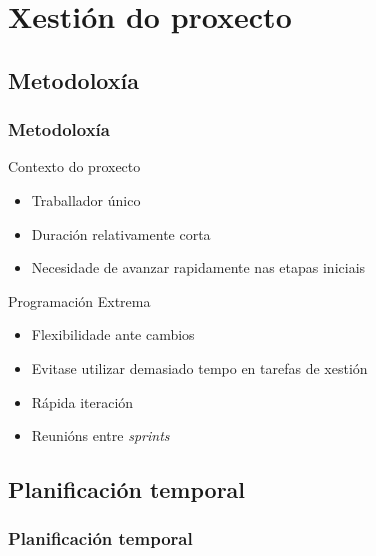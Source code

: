 \documentclass{beamer}
\begin{document}
\section{Xestión do proxecto}

\subsection{Metodoloxía}
\begin{frame}
\frametitle{Metodoloxía}

\begin{block}{Contexto do proxecto}
\begin{itemize}
	\item Traballador único
	\item Duración relativamente corta
	\item Necesidade de avanzar rapidamente nas etapas iniciais
\end{itemize}
\end{block}

\begin{block}{Programación Extrema}
	\begin{itemize}
		\item Flexibilidade ante cambios
		\item Evitase utilizar demasiado tempo en tarefas de xestión
		\item Rápida iteración
		\item Reunións entre \textit{sprints}
	\end{itemize}
\end{block}

\note{

}
\end{frame}

\subsection{Planificación temporal}
\begin{frame}
\frametitle{Planificación temporal}

\begin{center}
\end{center}

\note{

}
\end{frame}
\end{document}
